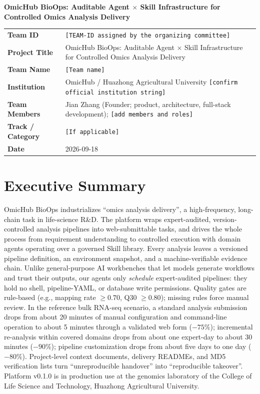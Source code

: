 \documentclass[11pt,a4paper]{article}
\begin{document}
\begin{center}
{\LARGE\bfseries OmicHub BioOps: Auditable Agent $\times$ Skill Infrastructure for Controlled Omics Analysis Delivery}\\[1.0em]
\end{center}

\begin{tabularx}{\textwidth}{>{\bfseries}p{}X}
\toprule
Team ID & \texttt{[TEAM-ID assigned by the organizing committee]}\\
Project Title & OmicHub BioOps: Auditable Agent $\times$ Skill Infrastructure for Controlled Omics Analysis Delivery\\
Team Name & \texttt{[Team name]}\\
Institution & OmicHub / Huazhong Agricultural University \texttt{[confirm official institution string]}\\
Team Members & Jian Zhang (Founder; product, architecture, full-stack development); \texttt{[add members and roles]}\\
Track / Category & \texttt{[If applicable]}\\
Date & 2026-09-18\\
\bottomrule
\end{tabularx}

\section*{Executive Summary}

OmicHub BioOps industrializes ``omics analysis delivery'', a high-frequency, long-chain task in life-science R\&D. The platform wraps expert-audited, version-controlled analysis pipelines into web-submittable tasks, and drives the whole process from requirement understanding to controlled execution with domain agents operating over a governed Skill library. Every analysis leaves a versioned pipeline definition, an environment snapshot, and a machine-verifiable evidence chain. Unlike general-purpose AI workbenches that let models generate workflows and trust their outputs, our agents only \emph{schedule} expert-audited pipelines: they hold no shell, pipeline-YAML, or database write permissions. Quality gates are rule-based (e.g., mapping rate $\geq 0.70$, Q30 $\geq 0.80$); missing rules force manual review. In the reference bulk RNA-seq scenario, a standard analysis submission drops from about 20 minutes of manual configuration and command-line operation to about 5 minutes through a validated web form ($-75\%$); incremental re-analysis within covered domains drops from about one expert-day to about 30 minutes ($-90\%$); pipeline customization drops from about five days to one day ($-80\%$). Project-level context documents, delivery READMEs, and MD5 verification lists turn ``unreproducible handover'' into ``reproducible takeover''. Platform v0.1.0 is in production use at the genomics laboratory of the College of Life Science and Technology, Huazhong Agricultural University.
\end{document}
